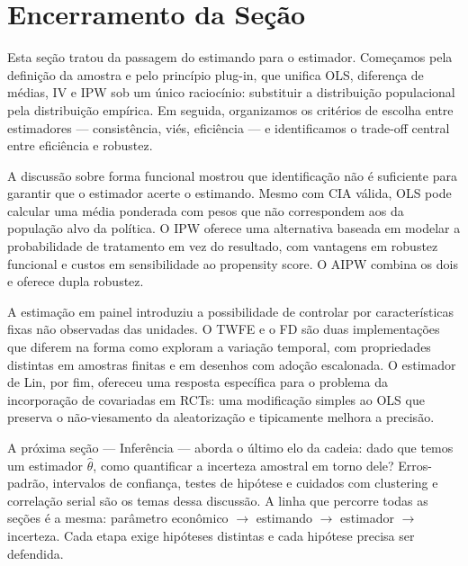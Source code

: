 \section*{Encerramento da Seção}

Esta seção tratou da passagem do estimando para o estimador. Começamos pela definição da amostra e pelo princípio plug-in, que unifica OLS, diferença de médias, IV e IPW sob um único raciocínio: substituir a distribuição populacional pela distribuição empírica. Em seguida, organizamos os critérios de escolha entre estimadores --- consistência, viés, eficiência --- e identificamos o trade-off central entre eficiência e robustez.

A discussão sobre forma funcional mostrou que identificação não é suficiente para garantir que o estimador acerte o estimando. Mesmo com CIA válida, OLS pode calcular uma média ponderada com pesos que não correspondem aos da população alvo da política. O IPW oferece uma alternativa baseada em modelar a probabilidade de tratamento em vez do resultado, com vantagens em robustez funcional e custos em sensibilidade ao propensity score. O AIPW combina os dois e oferece dupla robustez.

A estimação em painel introduziu a possibilidade de controlar por características fixas não observadas das unidades. O TWFE e o FD são duas implementações que diferem na forma como exploram a variação temporal, com propriedades distintas em amostras finitas e em desenhos com adoção escalonada. O estimador de Lin, por fim, ofereceu uma resposta específica para o problema da incorporação de covariadas em RCTs: uma modificação simples ao OLS que preserva o não-viesamento da aleatorização e tipicamente melhora a precisão.

A próxima seção --- Inferência --- aborda o último elo da cadeia: dado que temos um estimador $\hat{\theta}$, como quantificar a incerteza amostral em torno dele? Erros-padrão, intervalos de confiança, testes de hipótese e cuidados com clustering e correlação serial são os temas dessa discussão. A linha que percorre todas as seções é a mesma: parâmetro econômico $\to$ estimando $\to$ estimador $\to$ incerteza. Cada etapa exige hipóteses distintas e cada hipótese precisa ser defendida.

